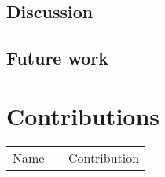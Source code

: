 \documentclass[conference]{IEEEtran}
\begin{document}
\subsection{Discussion}
\label{sec:Discussion}

\subsection{Future work}
\label{sec:future_work}



\vspace{12pt}

\newpage
\section*{Contributions}
\begin{tabular}{l|p{0.6\linewidth}}
Name & Contribution\\
\end{tabular}
\end{document}

